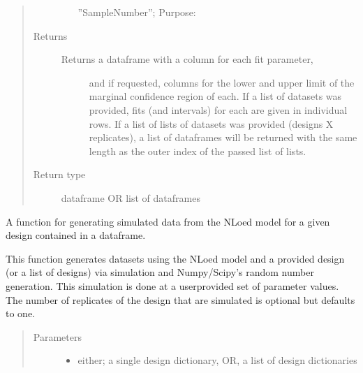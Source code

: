 \documentclass[letterpaper,10pt,english,openany,oneside]{sphinxmanual}
\begin{document}
\begin{fulllineitems}
\begin{fulllineitems}
\begin{quote}
\begin{description}
\begin{itemize}
”SampleNumber”;
Purpose:


\end{itemize}

\item[{Returns}] \leavevmode
\begin{description}
\item[{Returns a dataframe with a column for each fit parameter,}] \leavevmode
and if requested, columns for the lower and upper limit of the marginal confidence region
of each. If a list of datasets was provided, fits (and intervals) for each are given
in individual rows. If a list of lists of datasets was provided (designs X replicates),
a list of dataframes will be returned with the same length as the outer index of the
passed list of lists.

\end{description}


\item[{Return type}] \leavevmode
dataframe OR list of dataframes

\end{description}\end{quote}

\end{fulllineitems}


\begin{fulllineitems}
\label{\detokenize{nloed:nloed.model.Model.sample}}
A function for generating simulated data from the NLoed model for a given design contained in a dataframe.

This function generates datasets using the NLoed model and a provided design (or a list of
designs) via simulation and Numpy/Scipy’s random number generation. This simulation is done
at a user\sphinxhyphen{}provided set of parameter values. The number of replicates of the design that are
simulated is optional but defaults to one.
\begin{quote}\begin{description}
\item[{Parameters}] \leavevmode\begin{itemize}
\item {} 
 \textendash{} either; a single design dictionary, OR, a list of design dictionaries


\end{itemize}
\end{description}
\end{quote}
\end{fulllineitems}
\end{fulllineitems}
\end{document}
